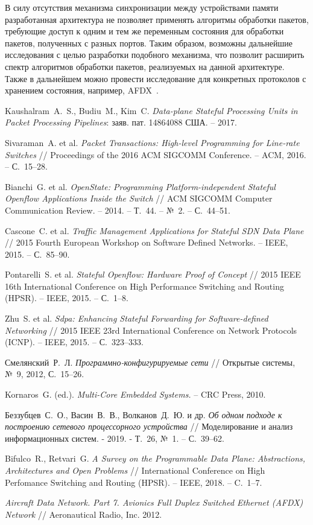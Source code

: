 \documentclass[conference]{IEEEtran}
\begin{document}
В силу отсутствия механизма синхронизации между устройствами
памяти разработанная архитектура не позволяет применять алгоритмы обработки
пакетов, требующие доступ к одним и тем же переменным состояния
для обработки пакетов, полученных с разных портов. Таким образом,
возможны дальнейшие исследования с целью разработки подобного механизма,
что позволит расширить спектр алгоритмов обработки пакетов,
реализуемых на данной архитектуре. Также в дальнейшем можно провести
исследование для конкретных протоколов с хранением состояния,
например, AFDX~\cite{AFDX}.


\begin{thebibliography}{00}

 Kaushalram~A.~S., Budiu~M., Kim~C.
\emph{Data-plane Stateful Processing Units in Packet Processing Pipelines}:
заяв. пат. 14864088 США. – 2017.

 Sivaraman~A. et al.
\emph{Packet Transactions: High-level Programming for Line-rate Switches}
// Proceedings of the 2016 ACM SIGCOMM Conference. – ACM, 2016. – С.~15--28.

 Bianchi~G. et al. \emph{OpenState:
Programming Platform-independent Stateful Openflow Applications Inside the
Switch} // ACM SIGCOMM Computer Communication Review. – 2014. – Т.~44. – №~2.
– С.~44--51.

 Cascone~C. et al. \emph{Traffic Management
Applications for Stateful SDN Data Plane} // 2015 Fourth European Workshop
on Software Defined Networks. – IEEE, 2015. – С.~85--90.

 Pontarelli~S. et al. \emph{Stateful
Openflow: Hardware Proof of Concept} // 2015 IEEE 16th International
Conference on High Performance Switching and Routing (HPSR). – IEEE, 2015.
– С.~1--8.

 Zhu~S. et al. \emph{Sdpa: Enhancing Stateful
Forwarding for Software-defined Networking} // 2015 IEEE 23rd International
Conference on Network Protocols (ICNP). – IEEE, 2015. – С.~323--333.

 Смелянский~Р.~Л. \emph{Программно-конфигурируемые
сети} // Открытые системы, №~9, 2012, С.~15--26.

 Kornaros~G. (ed.). \emph{Multi-Core
Embedded Systems.} -- CRC Press, 2010.

 Беззубцев~С.~О., Васин~В.~В., Волканов~Д.~Ю.
и др. \emph{Об одном подходе к построению сетевого процессорного устройства}
// Моделирование и анализ информационных систем. - 2019. - Т.~26, №~1. --
С.~39--62.

 Bifulco~R., Retvari~G. \emph{A Survey on
the Programmable Data Plane: Abstractions, Architectures and Open Problems}
// International Conference on High Perfomance Switching and Routing (HPSR). --
IEEE, 2018. -- C.~1--7.

 \emph{Aircraft Data Network. Part 7. Avionics Full Duplex
Switched Ethernet (AFDX) Network} // Aeronautical Radio, Inc. 2012.

\end{thebibliography}
\end{document}
